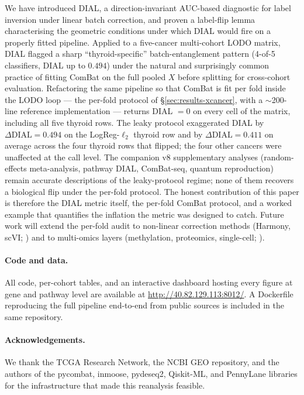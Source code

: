 \documentclass[11pt,a4paper]{article}
\begin{document}
We have introduced DIAL, a direction-invariant AUC-based diagnostic
for label inversion under linear batch correction, and proven a
label-flip lemma characterising the geometric conditions under which
DIAL would fire on a properly fitted pipeline. Applied to a
five-cancer multi-cohort LODO matrix, DIAL flagged a sharp
``thyroid-specific'' batch-entanglement pattern (4-of-5 classifiers,
DIAL up to $0.494$) under the natural and surprisingly common
practice of fitting ComBat on the full pooled $X$ before splitting
for cross-cohort evaluation. Refactoring the same pipeline so that
ComBat is fit per fold inside the LODO loop --- the per-fold protocol
of \S\ref{sec:results-xcancer}, with a $\sim$200-line reference
implementation --- returns DIAL $= 0$ on every cell of the matrix,
including all five thyroid rows. The leaky protocol exaggerated DIAL
by $\Delta\mathrm{DIAL} = 0.494$ on the LogReg-$\ell_2$ thyroid row
and by $\Delta\mathrm{DIAL} = 0.411$ on average across the four
thyroid rows that flipped; the four other cancers were unaffected at
the call level. The companion v8 supplementary analyses
(random-effects meta-analysis, pathway DIAL, ComBat-seq, quantum
reproduction) remain accurate descriptions of the leaky-protocol
regime; none of them recovers a biological flip under the per-fold
protocol. The honest contribution of this paper is therefore the DIAL
metric itself, the per-fold ComBat protocol, and a worked example
that quantifies the inflation the metric was designed to catch.
Future work will extend the per-fold audit to non-linear correction
methods (Harmony, scVI; \citep{korsunsky2019harmony,lopez2018scvi})
and to multi-omics layers (methylation, proteomics, single-cell;
\citep{giordano2005thyroid,landa2016thyroid}).

\paragraph{Code and data.} All code, per-cohort tables, and an
interactive dashboard hosting every figure at gene and pathway level
are available at \url{http://40.82.129.113:8012/}. A Dockerfile
reproducing the full pipeline end-to-end from public sources is
included in the same repository.

\paragraph{Acknowledgements.} We thank the TCGA Research Network, the
NCBI GEO repository, and the authors of the pycombat, inmoose,
pydeseq2, Qiskit-ML, and PennyLane libraries for the infrastructure
that made this reanalysis feasible.
\end{document}

